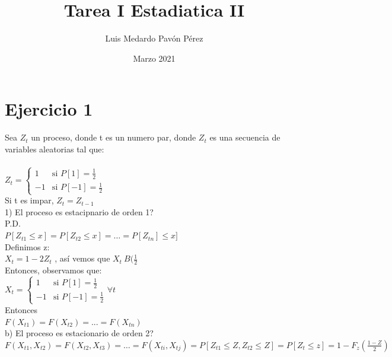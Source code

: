 \documentclass{article}
\title{Tarea I Estadiatica II}
\author{Luis Medardo Pavón Pérez }
\date{Marzo 2021}
\begin{document}
\maketitle

\section{Ejercicio 1}

Sea $Z_t$ un proceso, donde t es un numero par, donde $Z_t$ es una secuencia de variables aleatorias tal que:\\
\\
 $Z_t= \left \{\begin{array}{rl}  1 & \text{si } P[1]=\frac{1}{2} \\   -1 & \text{si }  P[-1]= \frac{1}{2} \end{array} \right. $\\
 
Si t es impar, $Z_t= Z_{t-1}$\\

1) El proceso es estacipnario de orden 1?\\

P.D.\\

$ P[Z_{t1} \leq x] = P[Z_{t2} \leq x]= \dotsc = P[Z_{tn}] \leq x] $ \\

Definimos z:\\

$X_t= 1-2 Z_t$ , as{í} vemos que $X_t ~ B(\frac{1}{2}$\\

Entonces, observamos que:\\

$ X_t= \left \{\begin{array}{rl}  1 & \text{si } P[1]=\frac{1}{2} \\   -1 & \text{si }  P[-1]= \frac{1}{2} \end{array} \right.  \forall t $\\


Entonces \\

$F(X_{t1}) = F(X_{t2})= ... = F(X_{tn})$\\


b) El proceso es estacionario de orden 2?\\

$F(X_{t1},X_{t2}) = F(X_{t2},X_{t3})= \dotsc = F(X_{ti},X_{tj}) = P[Z_{t1} \leq Z, Z_{t2} \leq Z] = P[Z_t \leq z] = 1-F_z(\frac{1-Z}{2})$\\
\end{document}
